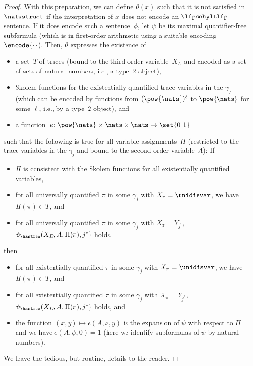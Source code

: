\begin{proof}
With this preparation, we can define $\theta(x)$ such that it is not satisfied in $\natsstruct$ if the interpretation of $x$ does not encode an $\lfpsohyltlfp$ sentence.
If it does encode such a sentence~$\phi$, let $\psi$ be its maximal quantifier-free subformula (which is  in first-order arithmetic using a suitable encoding~$\encode{\cdot}$).
Then, $\theta$ expresses the existence of
\begin{itemize}
    \item a set~$T$ of traces (bound to the third-order variable~$X_D$ and encoded as a set of sets of natural numbers, i.e., a type~$2$ object),
    \item Skolem functions for the existentially quantified trace variables in the $\gamma_j$ (which can be encoded by functions from $(\pow{\nats})^\ell$ to $\pow{\nats}$ for some $\ell$, i.e., by a type~$2$ object), and
    \item a function~$e \colon \pow{\nats} \times \nats \times \nats \rightarrow \set{0,1}$
\end{itemize}
such that the following is true for all variable assignments~$\Pi$ (restricted to the trace variables in the $\gamma_j$ and bound to the second-order variable~$A$):
If 
\begin{itemize}
    \item $\Pi$ is consistent with the Skolem functions for all existentially quantified variables,
    \item for all universally quantified $\pi$ in some $\gamma_j$ with $X_\pi = \unidisvar$, we have $\Pi(\pi) \in T$, and
    \item for all universally quantified $\pi$ in some $\gamma_j$ with $X_\pi = Y_{j^*}$, $\psi_{\hastree}(X_D,A, \Pi(\pi), j^*)$ holds, 
\end{itemize}
then
\begin{itemize}
    \item for all existentially quantified $\pi$ in some $\gamma_j$ with $X_\pi = \unidisvar$, we have $\Pi(\pi) \in T$, and
    \item for all existentially quantified $\pi$ in some $\gamma_j$ with $X_\pi = Y_{j^*}$, $\psi_{\hastree}(X_D,A, \Pi(\pi), j^*)$ holds, and
    \item the function~$(x,y)\mapsto e(A,x,y)$ is the expansion of $\psi$ with respect to $\Pi$ and we have $e(A,\psi,0) =1$ (here we identify subformulas of $\psi$ by natural numbers).
\end{itemize}
We leave the tedious, but routine, details to the reader. 
\end{proof}

